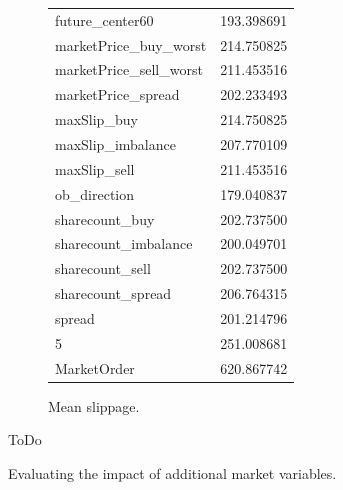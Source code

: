 \begin{figure}[ht]
\begin{subfigure}[b]{0.25\textwidth}
{\begin{tabular}{lr}
future\_center60        &  193.398691 \\
marketPrice\_buy\_worst  &  214.750825 \\
marketPrice\_sell\_worst &  211.453516 \\
marketPrice\_spread     &  202.233493 \\
maxSlip\_buy            &  214.750825 \\
maxSlip\_imbalance      &  207.770109 \\
maxSlip\_sell           &  211.453516 \\
ob\_direction           &  179.040837 \\
sharecount\_buy         &  202.737500 \\
sharecount\_imbalance   &  200.049701 \\
sharecount\_sell        &  202.737500 \\
sharecount\_spread      &  206.764315 \\
spread                 &  201.214796 \\
5                      &  251.008681 \\
MarketOrder            &  620.867742 \\
\bottomrule
\end{tabular}}        		 
        		\caption{Mean slippage.}
		\label{fig:eval:additionalMarketVariables:mean}
    	\end{subfigure}

	\caption{Evaluating the impact of additional market variables.}
	ToDo
	\label{fig:eval:additionalMarketVariables}
\end{figure}







\cleardoublepage{}